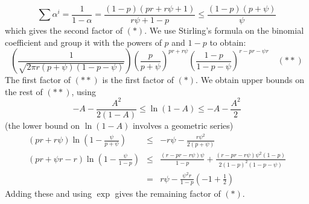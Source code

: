 $$\sum\alpha^i=\frac1{1-\alpha}=\frac{(1-p)(pr+r\psi+1)}{r\psi+1-p}\le
\frac{(1-p)(p+\psi)}\psi$$ which gives the second factor of $(*)$. We
use Stirling's formula on the binomial coefficient and group it with the
powers of $p$ and $1-p$ to obtain:
$$\left(\frac 1{\sqrt{2\pi r(p+\psi)(1-p-\psi)}}\right)
\left(\frac p{p+\psi}\right)^{pr+r\psi}
\left(\frac{1-p}{1-p-\psi}\right)^{r-pr-\psi r}\quad(**)$$
The first factor of $(**)$ is the first factor of $(*)$.  We
obtain upper bounds on the rest of $(**)$, using $$-A-\frac{A^2}{2(1-A)}
\le \ln(1-A)\le-A-\frac{A^2}2$$(the lower bound on $\ln(1-A)$ 
involves a geometric series)
\begin{eqnarray*}(pr+r\psi)\ln\left(1-\frac\psi{p+\psi}\right)
&\le&-r\psi-\frac{r\psi^2}{2(p+\psi)}\\
(pr+\psi r-r)\ln\left(1-\frac\psi{1-p}\right)&\le&
\frac{(r-pr-r\psi)\psi}{1-p}+
\frac{(r-pr-r\psi)\psi^2(1-p)}{2(1-p)^2(1-p-\psi)}\\
&=&r\psi-\frac{\psi^2r}{1-p}\left(-1+\frac12\right)\end{eqnarray*}
Adding these and using $\exp$ gives the remaining factor of $(*)$.
